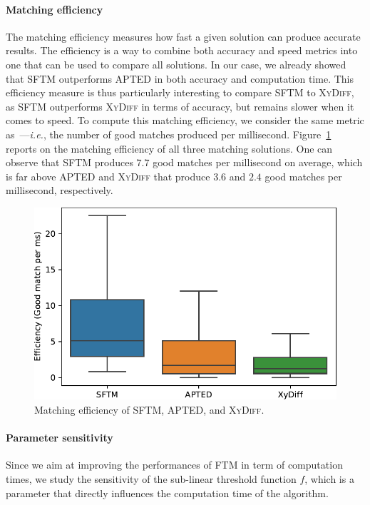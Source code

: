 \paragraph{Matching efficiency}
The matching efficiency measures how fast a given solution can produce accurate results.
The efficiency is a way to combine both accuracy and speed metrics into one that can be used to compare all solutions.
In our case, we already showed that SFTM outperforms APTED in both accuracy and computation time.
This efficiency measure is thus particularly interesting to compare SFTM to \textsc{XyDiff}, as SFTM outperforms \textsc{XyDiff} in terms of accuracy, but remains slower when it comes to speed.
To compute this matching efficiency, we consider the same metric as~\cite{oliveira2018efficient}---\emph{i.e.}, the number of good matches produced per millisecond.
Figure~\ref{fig:efficiency} reports on the matching efficiency of all three matching solutions.
One can observe that SFTM produces $7.7$ good matches per millisecond on average, which is far above APTED and \textsc{XyDiff} that produce $3.6$ and $2.4$ good matches per millisecond, respectively. 

\begin{figure}
    \centering
    \includegraphics[width=.8\linewidth]{tree-matching/graphs/efficiency}
    \caption{Matching efficiency of SFTM, APTED, and \textsc{XyDiff}.}
    \label{fig:efficiency}
\end{figure}

\paragraph{Parameter sensitivity}
Since we aim at improving the performances of FTM in term of computation times, we study the sensitivity of the sub-linear threshold function $f$, which is a parameter that directly influences the computation time of the algorithm.

